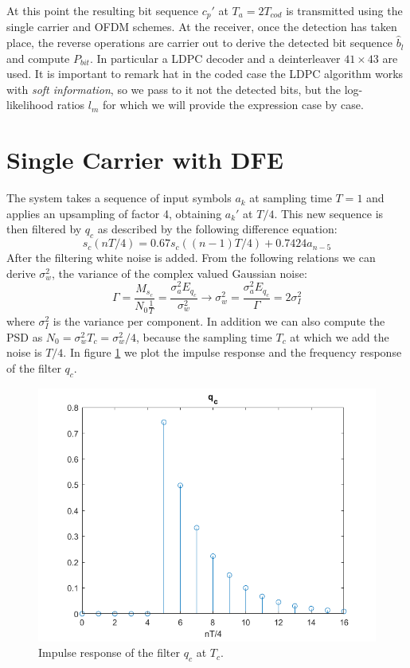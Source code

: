 \documentclass[a4paper,11.5pt]{article}
\begin{document}
At this point the resulting bit sequence $c_p'$ at $T_a = 2T_{cod}$ is transmitted using the single carrier and OFDM schemes. At the receiver, once the detection has taken place, the reverse operations are carrier out to derive the detected bit sequence $\hat{b}_l$ and compute $P_{bit}$. In particular a LDPC decoder and a deinterleaver $41\times 43$ are used. It is important to remark hat in the coded case the LDPC algorithm works with \emph{soft information}, so we pass to it not the detected bits, but the log-likelihood ratios $l_m$ for which we will provide the expression case by case.

\section*{Single Carrier with DFE}

The system takes a sequence of input symbols $a_k$ at sampling time $T=1$ and applies an upsampling of factor 4, obtaining $a_k'$ at $T/4$. This new sequence is then filtered by $q_c$ as described by the following difference equation:
\begin{equation}\label{eq:q_c}
s_c(nT/4) = 0.67 s_c((n-1)T/4) + 0.7424 a_{n-5}
\end{equation}
After the filtering white noise is added. From the following relations we can derive $\sigma_w^2$, the variance of the complex valued Gaussian noise:
\begin{equation}
\Gamma = \frac{M_{s_c}}{N_0\frac{1}{T}} = \frac{\sigma_a^2 E_{q_c}}{\sigma_w^2} \longrightarrow \sigma_w^2 = \frac{\sigma_a^2 E_{q_c}}{\Gamma} = 2\sigma_I^2
\end{equation}
where $\sigma_I^2$ is the variance per component. In addition we can also compute the PSD as $N_0=\sigma_w^2 T_c=\sigma_w^2/4$, because the sampling time $T_c$ at which we add the noise is $T/4$.
In figure \ref{fig:qc} we plot the impulse response and the frequency response of the filter $q_c$.

\begin{figure}[H]
	\begin{center}   
		\includegraphics[width=\textwidth]{figs/q_c.png}  
		\caption{Impulse response of the filter $q_c$ at $T_c$.}
		\label{fig:qc}
	\end{center}
\end{figure} 
\end{document}
